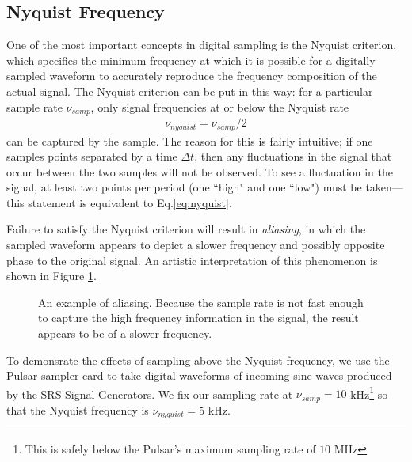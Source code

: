 \documentclass[12pt]{article}
\begin{document}
\subsection{Nyquist Frequency}
One of the most important concepts in digital sampling is the Nyquist criterion, which specifies the minimum frequency at which it is possible for a digitally sampled waveform to accurately reproduce the frequency composition of the actual signal. The Nyquist criterion can be put in this way: for a particular sample rate $\nu_{samp}$, only signal frequencies at or below the Nyquist rate
\begin{eqnarray}
 \nu_{nyquist} = \nu_{samp} / 2 \label{eq:nyquist}
\end{eqnarray}
can be captured by the sample. The reason for this is fairly intuitive; if one samples points separated by a time $\Delta{t}$, then any fluctuations in the signal that occur between the two samples will not be observed. To see a fluctuation in the signal, at least two points per period (one ``high" and one ``low") must be taken---this statement is equivalent to Eq.\ref{eq:nyquist}.

Failure to satisfy the Nyquist criterion will result in \textit{aliasing}, in which the sampled waveform appears to depict a slower frequency and possibly opposite phase to the original signal. An artistic interpretation of this phenomenon is shown in Figure \ref{fig:aliasing}.
\begin{figure}[H]
\caption[SODUMB]{An example of aliasing. Because the sample rate is not fast enough to capture the high frequency information in the signal, the result appears to be of a slower frequency.}
\label{fig:aliasing}
\end{figure}

To demonsrate the effects of sampling above the Nyquist frequency, we use the Pulsar sampler card to take digital waveforms of incoming sine waves produced by the SRS Signal Generators. We fix our sampling rate at $\nu_{samp} = 10$ kHz\footnote{This is safely below the Pulsar's maximum sampling rate of $10$ MHz} so that the Nyquist frequency is $\nu_{nyquist} = 5$ kHz.
\end{document}
